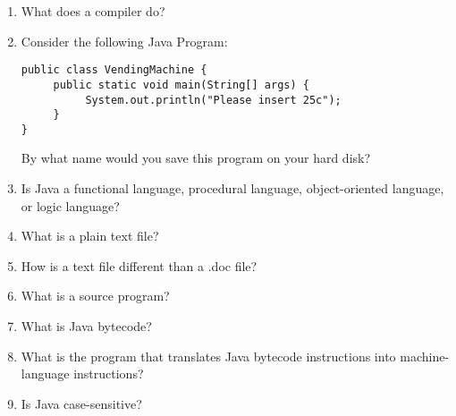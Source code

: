 \setcounter{counter}{1}
\begin{enumerate}[label={\arabic{counter}\addtocounter{counter}{1}}.]

\item What does a compiler do?

\item Consider the following Java Program:
\begin{lstlisting}
public class VendingMachine {
     public static void main(String[] args) {
          System.out.println("Please insert 25c");
     }
}
\end{lstlisting}
By what name would you save this program on your hard disk?

\item Is Java a functional language, procedural language, object-oriented language, or logic language?

\item What is a plain text file?

\item How is a text file different than a .doc file?

\item What is a source program?

\item What is Java bytecode?

\item What is the program that translates Java bytecode instructions into machine-language instructions?

\item Is Java case-sensitive?

\end{enumerate}

